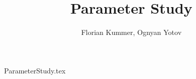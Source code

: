 \documentclass[10pt,a4paper]{article}
\title{Parameter Study }
\author{Florian Kummer, Ognyan Yotov}
\begin{document}
\maketitle

{ParameterStudy.tex}
\end{document}
